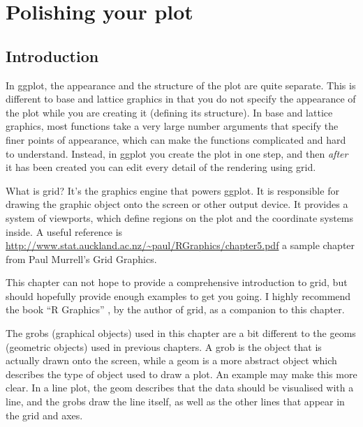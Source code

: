 

\chapter{Polishing your plot}

\section{Introduction}

In ggplot, the appearance and the structure of the plot are quite separate.  This is different to base and lattice graphics in that you do not specify the appearance of the plot while you are creating it (defining its structure).  In base and lattice graphics, most functions take a very large number arguments that specify the finer points of appearance, which can make the functions complicated and hard to understand.  Instead, in ggplot you create the plot in one step, and then {\em after} it has been created you can edit every detail of the rendering using grid.


What is grid?  It's the graphics engine that powers ggplot.  It is responsible for drawing the graphic object onto the screen or other output device.  It provides a system of viewports, which define regions on the plot and the coordinate systems inside.  A useful reference is \url{http://www.stat.auckland.ac.nz/~paul/RGraphics/chapter5.pdf} a sample chapter from Paul Murrell's Grid Graphics.

This chapter can not hope to provide a comprehensive introduction to grid, but should hopefully provide enough examples to get you going.   I highly recommend the book ``R Graphics'' \citep{murrell:2005}, by the author of grid,  as a companion to this chapter.   

The grobs (graphical objects) used in this chapter are a bit different to the geoms (geometric objects) used in previous chapters.  A grob is the object that is actually drawn onto the screen, while a geom is a more abstract object which describes the type of object used to draw a plot.  An example may make this more clear. In a line plot, the geom describes that the data should be visualised with a line, and the grobs draw the line itself, as well as the other lines that appear in the grid and axes.

